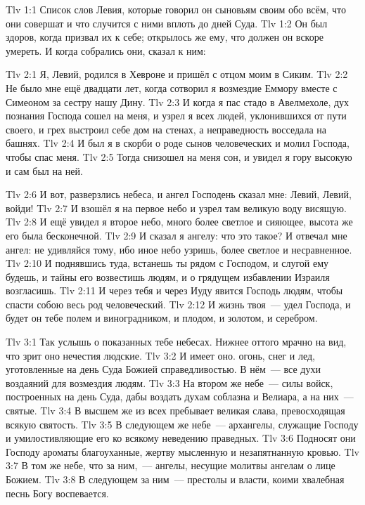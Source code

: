 \vs Tlv 1:1
Список слов Левия, которые говорил он сыновьям своим обо всём,
что они совершат и что случится с ними вплоть до дней Суда.
\vs Tlv 1:2
Он был здоров, когда призвал их к себе;
открылось же ему, что должен он вскоре умереть.
И когда собрались они, сказал к ним:

\vs Tlv 2:1
Я, Левий, родился в Хевроне и пришёл с отцом моим в Сиким.
\vs Tlv 2:2
Не было мне ещё двадцати лет,
когда сотворил я возмездие Еммору вместе с Симеоном за сестру нашу Дину.
\vs Tlv 2:3
И когда я пас стадо в Авелмехоле,
дух познания Господа сошел на меня,
и узрел я всех людей, уклонившихся от пути своего,
и грех выстроил себе дом на стенах, а неправедность восседала на башнях.
\vs Tlv 2:4
И был я в скорби о роде сынов человеческих и молил Господа,
чтобы спас меня.
\vs Tlv 2:5
Тогда снизошел на меня сон, и увидел я гору высокую и сам был на ней.

\vs Tlv 2:6
И вот, разверзлись небеса, и ангел Господень сказал мне:
Левий, Левий, войди!
\vs Tlv 2:7
И взошёл я на первое небо и узрел там великую воду висящую.
\vs Tlv 2:8
И ещё увидел я второе небо, много более светлое и сияющее,
высота же его была бесконечной.
\vs Tlv 2:9
И сказал я ангелу: что это такое?
И отвечал мне ангел: не удивляйся тому, ибо иное небо узришь,
более светлое и несравненное.
\vs Tlv 2:10
И поднявшись туда, встанешь ты рядом с Господом, и слугой ему будешь,
и тайны его возвестишь людям, и о грядущем избавлении Израиля возгласишь.
\vs Tlv 2:11
И через тебя и через Иуду явится Господь людям,
чтобы спасти собою весь род человеческий.
\vs Tlv 2:12
И жизнь твоя~--- удел Господа,
и будет он тебе полем и виноградником, и плодом, и золотом, и серебром.

\vs Tlv 3:1
Так услышь о показанных тебе небесах.
Нижнее оттого мрачно на вид, что зрит оно нечестия людские.
\vs Tlv 3:2
И имеет оно. огонь, снег и лед,
уготовленные на день Суда Божией справедливостью.
В нём~---  все духи воздаяний для возмездия людям.
\vs Tlv 3:3
На втором же небе~--- силы войск, построенных на день Суда,
дабы воздать духам соблазна и Велиара, а на них~--- святые.
\vs Tlv 3:4
В высшем же из всех пребывает великая слава,
превосходящая всякую святость.
\vs Tlv 3:5
В следующем же небе~--- архангелы,
служащие Господу и умилостивляющие его
ко всякому неведению праведных.
\vs Tlv 3:6
Подносят они Господу ароматы благоуханные,
жертву мысленную и незапятнанную кровью.
\vs Tlv 3:7
В том же небе, что за ним,~--- ангелы,
несущие молитвы ангелам о лице Божием.
\vs Tlv 3:8
В следующем за ним~--- престолы и власти,
коими хвалебная песнь Богу воспевается.

